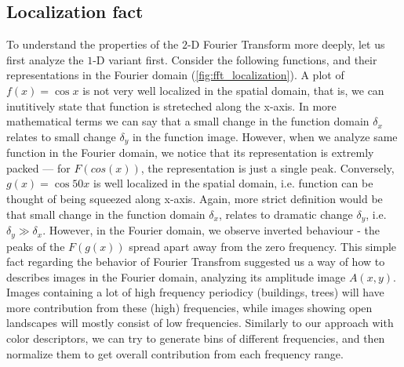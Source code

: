 \documentclass{report}
\begin{document}
\subsection{Localization fact}
To understand the properties of the $2$-D Fourier Transform more deeply, let us first analyze the $1$-D variant first. Consider the following functions, and their representations in the Fourier domain (\ref{fig:fft_localization}). A plot of $f(x)=\cos {x}$ is not very well localized in the spatial domain, that is, we can inutitively state that function is streteched along the x-axis. In more mathematical terms we can say that a small change in the function domain $\delta_x$ relates to small change $\delta_y$ in the function image.  However, when we analyze same function in the Fourier domain, we notice that its representation is extremly packed --- for $F(cos(x))$, the representation is just a single peak. Conversely, $g(x)=\cos {50x}$ is well localized in the spatial domain, i.e. function can be thought of being squeezed along x-axis. Again, more strict definition would be that small change in the function domain $\delta_x$, relates to dramatic change $\delta_y$, i.e. $\delta_y \gg \delta_x$. However, in the Fourier domain, we observe inverted behaviour - the peaks of the $F(g(x))$ spread apart away from the zero frequency. This simple fact regarding the behavior of Fourier Transfrom suggested us a way of how to describes images in the Fourier domain, analyzing its amplitude image $A(x,y)$. Images containing a lot of high frequency periodicy (buildings, trees) will have more contribution from these (high) frequencies, while images showing open landscapes will mostly consist of low frequencies. Similarly to our approach with color descriptors, we can try to generate bins of different frequencies, and then normalize them to get overall contribution from each frequency range.
\end{document}
